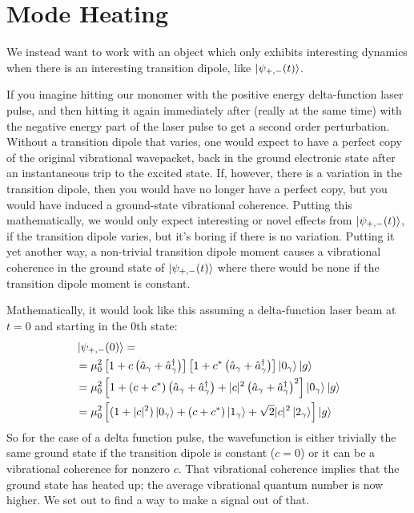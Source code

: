 \section{Mode Heating}
We instead want to work with an object which only exhibits interesting dynamics when there is an interesting transition dipole, like $\ket{\psi_{+,-}(t)}$.

If you imagine hitting our monomer with the positive energy delta-function laser pulse, and then hitting it again immediately after (really at the same time) with the negative energy part of the laser pulse to get a second order perturbation.  Without a transition dipole that varies, one would expect to have a perfect copy of the original vibrational wavepacket, back in the ground electronic state after an instantaneous trip to the excited state.  If, however, there is a variation in the transition dipole, then you would have no longer have a perfect copy, but you would have induced a ground-state vibrational coherence.  Putting this mathematically, we would only expect interesting or novel effects from $\ket{\psi_{+,-}(t)}$, if the transition dipole varies, but it's boring if there is no variation.   Putting it yet another way, a non-trivial transition dipole moment causes a vibrational coherence in the ground state of  $\ket{\psi_{+,-}(t)}$ where there would be none if the transition dipole moment is constant.

Mathematically, it would look like this assuming a delta-function laser beam at $t=0$ and starting in the 0th state:
\begin{align}
	&\ket{\psi_{+,-}(0)} =\\
	&= \mu_0^2 \left[ 1 + c \left( \hat{a}_{\gamma} + \hat{a}_{\gamma}^{\dagger}\right)  \right]\left[ 1 + c^* \left( \hat{a}_{\gamma} + \hat{a}_{\gamma}^{\dagger}\right)  \right] \ket{0_{\gamma}} \ket{g}\\
	&= \mu_0^2 \left[ 1 + \left(c + c^*\right) \left( \hat{a}_{\gamma} + \hat{a}_{\gamma}^{\dagger}\right) + |c|^2 \left( \hat{a}_{\gamma} + \hat{a}_{\gamma}^{\dagger}\right)^2  \right] \ket{0_{\gamma}} \ket{g}\\
	&= \mu_0^2 \left[ (1 + |c|^2) \ket{0_{\gamma}} + \left(c + c^*\right)\ket{1_{\gamma}}  + \sqrt{2}|c|^2 \ket{2_{\gamma}} \right]  \ket{g}
\end{align}
So for the case of a delta function pulse, the wavefunction is either trivially the same ground state if the transition dipole is constant ($c=0$) or it can be a vibrational coherence for nonzero $c$.  That vibrational coherence implies that the ground state has heated up; the average vibrational quantum number is now higher.  We set out to find a way to make a signal out of that.

